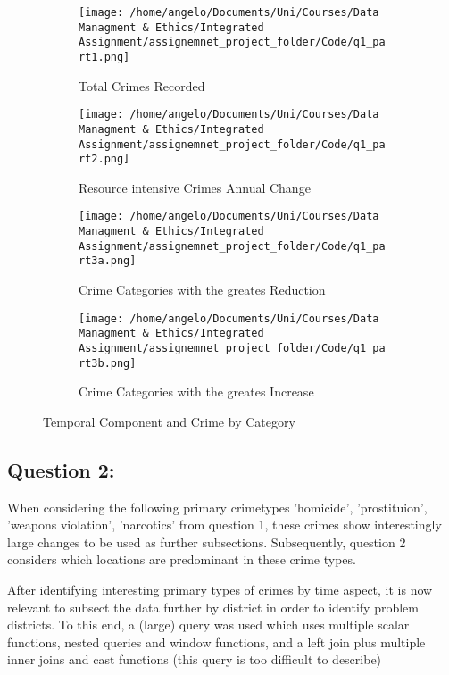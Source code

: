 \documentclass[a4paper]{article}
\begin{document}
\begin{figure}%
\centering
\begin{subfigure}[b]{0.5\textwidth}
\texttt{[image: /home/angelo/Documents/Uni/Courses/Data Managment \& Ethics/Integrated Assignment/assignemnet\_project\_folder/Code/q1\_part1.png]}
   \caption{Total Crimes Recorded}
   \label{fig:Ng2}
\end{subfigure}

\begin{subfigure}[b]{0.5\textwidth}
\texttt{[image: /home/angelo/Documents/Uni/Courses/Data Managment \& Ethics/Integrated Assignment/assignemnet\_project\_folder/Code/q1\_part2.png]}
   \caption{Resource intensive Crimes Annual Change}
   \label{fig:Ng2}
\end{subfigure}

\begin{subfigure}[b]{0.5\textwidth}
\texttt{[image: /home/angelo/Documents/Uni/Courses/Data Managment \& Ethics/Integrated Assignment/assignemnet\_project\_folder/Code/q1\_part3a.png]}
   \caption{Crime Categories with the greates Reduction}
   \label{fig:Ng2}
\end{subfigure}

\begin{subfigure}[b]{0.5\textwidth}
\texttt{[image: /home/angelo/Documents/Uni/Courses/Data Managment \& Ethics/Integrated Assignment/assignemnet\_project\_folder/Code/q1\_part3b.png]}
   \caption{Crime Categories with the greates Increase}
   \label{fig:Ng2}
\end{subfigure}

\captionsetup{justification=centering}
\caption{Temporal Component and Crime by Category}
\end{figure}



\subsection{Question 2:}


When considering the following primary crimetypes 'homicide', 'prostituion', 'weapons violation', 'narcotics' from question 1, these crimes show interestingly large changes to be used as further subsections. Subsequently, question 2 considers which locations are predominant in these crime types. 

After identifying interesting primary types of crimes by time aspect, it is now relevant to subsect the data further by district in order to identify problem districts. To this end, a (large) query was used which uses multiple scalar functions, nested queries and window functions, and a left join plus multiple inner joins and cast functions (this query is too difficult to describe)
\end{document}
